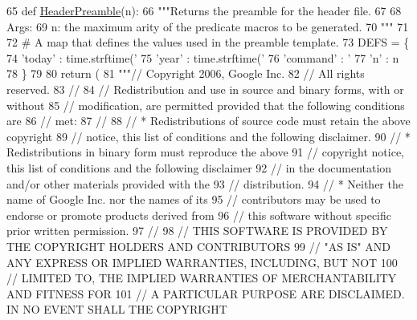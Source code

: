\begin{DoxyCode}
65 \textcolor{keyword}{def }\hyperlink{namespacegen__gtest__pred__impl_a0b99cadcffab4bf161654a382163bac8}{HeaderPreamble}(n):
66   \textcolor{stringliteral}{"""Returns the preamble for the header file.}
67 \textcolor{stringliteral}{}
68 \textcolor{stringliteral}{  Args:}
69 \textcolor{stringliteral}{    n:  the maximum arity of the predicate macros to be generated.}
70 \textcolor{stringliteral}{  """}
71 
72   \textcolor{comment}{# A map that defines the values used in the preamble template.}
73   DEFS = \{
74     \textcolor{stringliteral}{'today'} : time.strftime(\textcolor{stringliteral}{'%
75     \textcolor{stringliteral}{'year'} : time.strftime(\textcolor{stringliteral}{'%
76     \textcolor{stringliteral}{'command'} : \textcolor{stringliteral}{'%
77     \textcolor{stringliteral}{'n'} : n
78     \}
79 
80   \textcolor{keywordflow}{return} (
81 \textcolor{stringliteral}{"""// Copyright 2006, Google Inc.}
82 \textcolor{stringliteral}{// All rights reserved.}
83 \textcolor{stringliteral}{//}
84 \textcolor{stringliteral}{// Redistribution and use in source and binary forms, with or without}
85 \textcolor{stringliteral}{// modification, are permitted provided that the following conditions are}
86 \textcolor{stringliteral}{// met:}
87 \textcolor{stringliteral}{//}
88 \textcolor{stringliteral}{//     * Redistributions of source code must retain the above copyright}
89 \textcolor{stringliteral}{// notice, this list of conditions and the following disclaimer.}
90 \textcolor{stringliteral}{//     * Redistributions in binary form must reproduce the above}
91 \textcolor{stringliteral}{// copyright notice, this list of conditions and the following disclaimer}
92 \textcolor{stringliteral}{// in the documentation and/or other materials provided with the}
93 \textcolor{stringliteral}{// distribution.}
94 \textcolor{stringliteral}{//     * Neither the name of Google Inc. nor the names of its}
95 \textcolor{stringliteral}{// contributors may be used to endorse or promote products derived from}
96 \textcolor{stringliteral}{// this software without specific prior written permission.}
97 \textcolor{stringliteral}{//}
98 \textcolor{stringliteral}{// THIS SOFTWARE IS PROVIDED BY THE COPYRIGHT HOLDERS AND CONTRIBUTORS}
99 \textcolor{stringliteral}{// "AS IS" AND ANY EXPRESS OR IMPLIED WARRANTIES, INCLUDING, BUT NOT}
100 \textcolor{stringliteral}{// LIMITED TO, THE IMPLIED WARRANTIES OF MERCHANTABILITY AND FITNESS FOR}
101 \textcolor{stringliteral}{// A PARTICULAR PURPOSE ARE DISCLAIMED. IN NO EVENT SHALL THE COPYRIGHT}
}}}
\end{DoxyCode}
